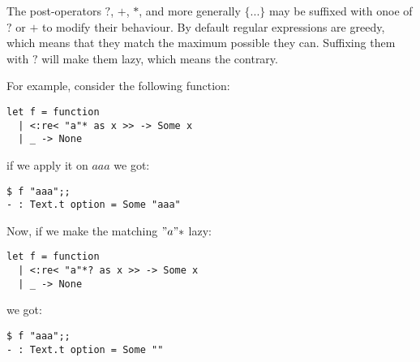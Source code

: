 \documentclass{article}
\begin{document}
The post-operators $?$, $+$, $*$, and more generally $\{...\}$ may be
suffixed with onoe of $?$ or $+$ to modify their behaviour. By default
regular expressions are greedy, which means that they match the
maximum possible they can. Suffixing them with $?$ will make them
lazy, which means the contrary.

For example, consider the following function:

\begin{verbatim}
let f = function
  | <:re< "a"* as x >> -> Some x
  | _ -> None
\end{verbatim}

if we apply it on $aaa$ we got:

\begin{verbatim}
$ f "aaa";;
- : Text.t option = Some "aaa"
\end{verbatim}

Now, if we make the matching $"a"*$ lazy:

\begin{verbatim}
let f = function
  | <:re< "a"*? as x >> -> Some x
  | _ -> None
\end{verbatim}

we got:

\begin{verbatim}
$ f "aaa";;
- : Text.t option = Some ""
\end{verbatim}
\end{document}
